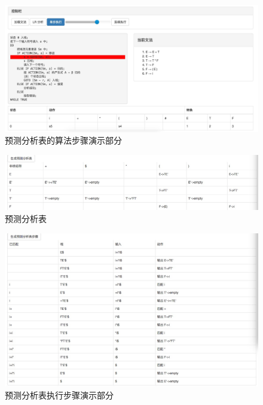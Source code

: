 \begin{figure}[!htb]
	\centering
	\includegraphics[width=1\linewidth]{img/tableanalyze.jpg}
	\caption{预测分析表的算法步骤演示部分}
	\label{fig:tableanalyze.jpg}
\end{figure}

\begin{figure}[!htb]
	\centering
	\includegraphics[width=1\linewidth]{img/table.png}
	\caption{预测分析表}
	\label{fig:table.png}
\end{figure}

\begin{figure}[!htb]
	\centering
	\includegraphics[width=1\linewidth]{img/tablegenerator.png}
	\caption{预测分析表执行步骤演示部分}
	\label{fig:tablegenerator.png}
\end{figure}

